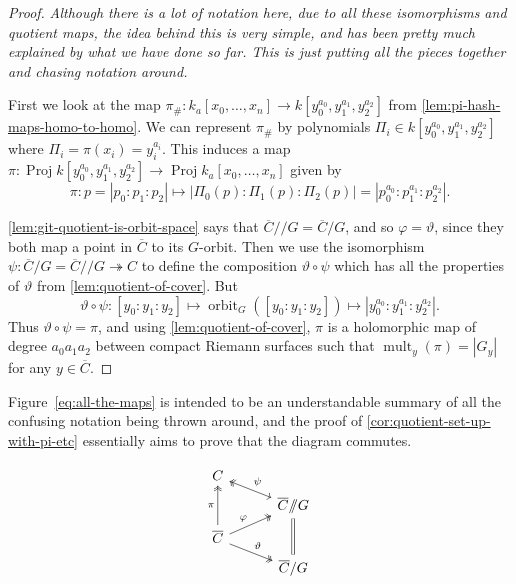 \documentclass[10pt,notitlepage]{article}
\numberwithin{equation}{subsection}
\DeclareMathOperator{\proj}{Proj}
\DeclareMathOperator{\mult}{mult}
\DeclareMathOperator{\orbit}{orbit}
\newcommand{\cover}[1]{\overline{#1}}
\newcommand{\kazn}{k_a[x_0,\ldots,x_n]}
\newcommand{\sslash}{/\!\!/}
\begin{document}
        \begin{proof}
            \emph{Although there is a lot of notation here, due to all these isomorphisms and quotient maps, the idea behind this is very simple, and has been pretty much explained by what we have done so far.
                        This is just putting all the pieces together and chasing notation around.}

            First we look at the map $\pi_\#\colon\kazn\to k[y_0^{a_0},y_1^{a_1},y_2^{a_2}]$ from \cref{lem:pi-hash-maps-homo-to-homo}.
            We can represent $\pi_\#$ by polynomials $\Pi_i\in k[y_0^{a_0},y_1^{a_1},y_2^{a_2}]$ where $\Pi_i=\pi(x_i)=y_i^{a_i}$.
            This induces a map $\pi\colon\proj k[y_0^{a_0},y_1^{a_1},y_2^{a_2}]\to\proj\kazn$ given by
            \[
                \pi\colon p=|p_0:p_1:p_2|\mapsto|\Pi_0(p):\Pi_1(p):\Pi_2(p)| = |p_0^{a_0}:p_1^{a_1}:p_2^{a_2}|.
            \]

            \cref{lem:git-quotient-is-orbit-space} says that $\cover{C}\sslash G=\cover{C}/G$, and so $\varphi=\vartheta$, since they both map a point in $\cover{C}$ to its $G$-orbit.
            Then we use the isomorphism $\psi\colon\cover{C}/G=\cover{C}\sslash G\twoheadrightarrow C$ to define the composition $\vartheta\circ\psi$ which has all the properties of $\vartheta$ from \cref{lem:quotient-of-cover}.
            But
            \[
                \vartheta\circ\psi\colon [y_0:y_1:y_2]\mapsto\orbit_G([y_0:y_1:y_2])\mapsto|y_0^{a_0}:y_1^{a_1}:y_2^{a_2}|.
            \]
            Thus $\vartheta\circ\psi=\pi$, and using \cref{lem:quotient-of-cover}, $\pi$ is a holomorphic map of degree $a_0a_1a_2$ between compact Riemann surfaces such that $\mult_y(\pi)=|G_y|$ for any $y\in\cover{C}$.
        \end{proof}

        Figure~\ref{eq:all-the-maps} is intended to be an understandable summary of all the confusing notation being thrown around, and the proof of \cref{cor:quotient-set-up-with-pi-etc} essentially aims to prove that the diagram commutes.

        \begin{equation}\label{eq:all-the-maps}
            \begin{tikzcd}[column sep=3em, row sep=0.5em]
                C
                &
                \\
                &
                \cover{C}\sslash G
                    \ular[hookleftarrow, two heads, swap]{\psi}
                    \arrow[-, double equal sign distance]{dd}
                \\
                \cover{C}
                    \arrow[two heads]{uu}{\pi}
                    \urar[two heads]{\varphi}
                    \drar[two heads]{\vartheta}
                &
                \\
                &
                \cover{C}/G
            \end{tikzcd}
        \end{equation}
\end{document}
